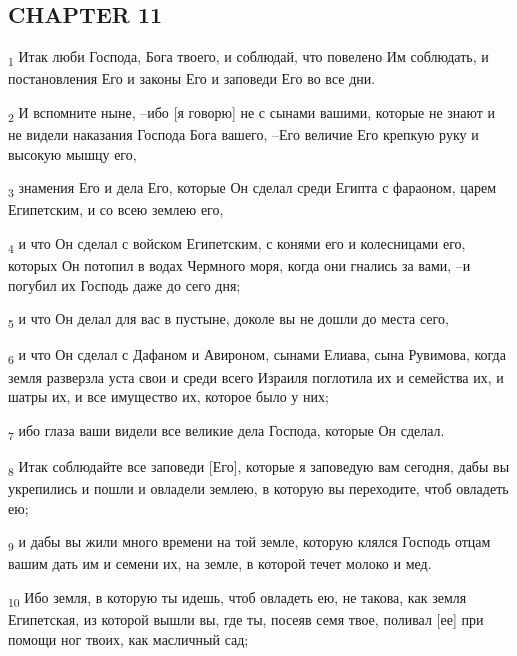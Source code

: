 \subsection{CHAPTER 11}
\begin{tcolorbox}
\textsubscript{1} Итак люби Господа, Бога твоего, и соблюдай, что повелено Им соблюдать, и постановления Его и законы Его и заповеди Его во все дни.
\end{tcolorbox}
\begin{tcolorbox}
\textsubscript{2} И вспомните ныне, --ибо [я говорю] не с сынами вашими, которые не знают и не видели наказания Господа Бога вашего, --Его величие Его крепкую руку и высокую мышцу его,
\end{tcolorbox}
\begin{tcolorbox}
\textsubscript{3} знамения Его и дела Его, которые Он сделал среди Египта с фараоном, царем Египетским, и со всею землею его,
\end{tcolorbox}
\begin{tcolorbox}
\textsubscript{4} и что Он сделал с войском Египетским, с конями его и колесницами его, которых Он потопил в водах Чермного моря, когда они гнались за вами, --и погубил их Господь даже до сего дня;
\end{tcolorbox}
\begin{tcolorbox}
\textsubscript{5} и что Он делал для вас в пустыне, доколе вы не дошли до места сего,
\end{tcolorbox}
\begin{tcolorbox}
\textsubscript{6} и что Он сделал с Дафаном и Авироном, сынами Елиава, сына Рувимова, когда земля разверзла уста свои и среди всего Израиля поглотила их и семейства их, и шатры их, и все имущество их, которое было у них;
\end{tcolorbox}
\begin{tcolorbox}
\textsubscript{7} ибо глаза ваши видели все великие дела Господа, которые Он сделал.
\end{tcolorbox}
\begin{tcolorbox}
\textsubscript{8} Итак соблюдайте все заповеди [Его], которые я заповедую вам сегодня, дабы вы укрепились и пошли и овладели землею, в которую вы переходите, чтоб овладеть ею;
\end{tcolorbox}
\begin{tcolorbox}
\textsubscript{9} и дабы вы жили много времени на той земле, которую клялся Господь отцам вашим дать им и семени их, на земле, в которой течет молоко и мед.
\end{tcolorbox}
\begin{tcolorbox}
\textsubscript{10} Ибо земля, в которую ты идешь, чтоб овладеть ею, не такова, как земля Египетская, из которой вышли вы, где ты, посеяв семя твое, поливал [ее] при помощи ног твоих, как масличный сад;
\end{tcolorbox}

